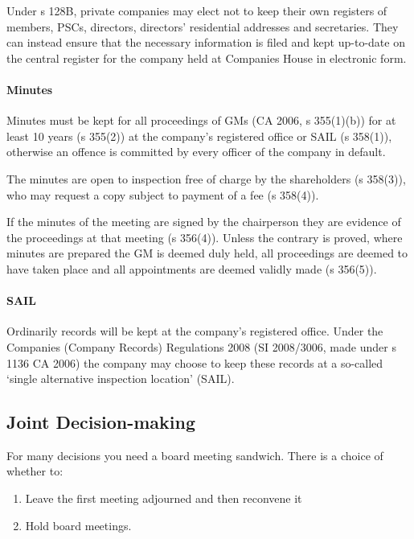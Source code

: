 \documentclass[
]{article}
\providecommand{\tightlist}{%
  \setlength{\itemsep}{0pt}\setlength{\parskip}{0pt}}
\begin{document}
Under s 128B, private companies may elect not to keep their own
registers of members, PSCs, directors, directors' residential addresses
and secretaries. They can instead ensure that the necessary information
is filed and kept up-to-date on the central register for the company
held at Companies House in electronic form.

\hypertarget{minutes}{%
\paragraph{Minutes}\label{minutes}}

Minutes must be kept for all proceedings of GMs (CA 2006, s 355(1)(b))
for at least 10 years (s 355(2)) at the company's registered office or
SAIL (s 358(1)), otherwise an offence is committed by every officer of
the company in default.

The minutes are open to inspection free of charge by the shareholders (s
358(3)), who may request a copy subject to payment of a fee (s 358(4)).

If the minutes of the meeting are signed by the chairperson they are
evidence of the proceedings at that meeting (s 356(4)). Unless the
contrary is proved, where minutes are prepared the GM is deemed duly
held, all proceedings are deemed to have taken place and all
appointments are deemed validly made (s 356(5)).

\hypertarget{sail}{%
\paragraph{SAIL}\label{sail}}

Ordinarily records will be kept at the company's registered office.
Under the Companies (Company Records) Regulations 2008 (SI 2008/3006,
made under s 1136 CA 2006) the company may choose to keep these records
at a so-called `single alternative inspection location' (SAIL).

\hypertarget{joint-decision-making}{%
\subsection{Joint Decision-making}\label{joint-decision-making}}

For many decisions you need a board meeting sandwich. There is a choice
of whether to:

\begin{enumerate}
\tightlist
\item
  Leave the first meeting adjourned and then reconvene it
\item
  Hold board meetings.
\end{enumerate}
\end{document}
